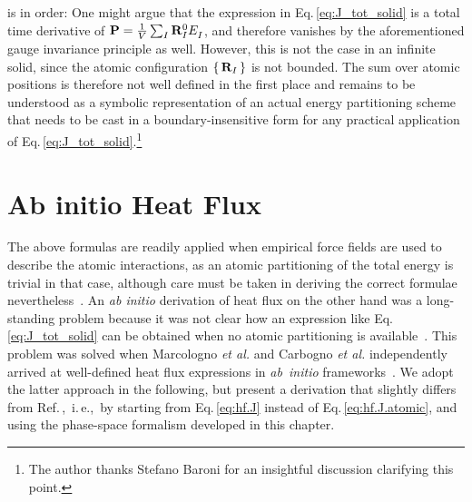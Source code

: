  is in order: One might argue that the expression in Eq.\,\eqref{eq:J_tot_solid} is a total time derivative of ${\bf P} = \frac{1}{V}  \sum_I {\bf R}_I^0 \fD E_I$, and therefore vanishes by the aforementioned gauge invariance principle as well. However, this is not the case in an infinite solid, since the atomic configuration $\set{{\bf R}_I}$ is not bounded. The sum over atomic positions is therefore not well defined in the first place and remains to be understood as a symbolic representation of an actual energy partitioning scheme that needs to be cast in a boundary-insensitive form for any practical application of Eq.\,\eqref{eq:J_tot_solid}.\footnote{The author thanks Stefano Baroni for an insightful discussion clarifying this point.}

\section{Ab initio Heat Flux}
The above formulas are readily applied when empirical force fields are used to describe the atomic interactions, as an atomic partitioning of the total energy is trivial in that case, although care must be taken in deriving the correct formulae nevertheless~\cite{Fan2015,Boone2019}. An \emph{ab initio} derivation of heat flux on the other hand was a long-standing problem because it was not clear how an expression like Eq.\,\eqref{eq:J_tot_solid} can be obtained when no atomic partitioning is available~\cite{Stackhouse2010}. This problem was solved when Marcologno \emph{et al.} and Carbogno \emph{et al.} independently arrived at well-defined heat flux expressions in \mbox{\emph{ab initio}} frameworks~\cite{Marcolongo2016,Carbogno2016}. We adopt the latter approach in the following, but present a derivation that slightly differs from Ref.\,\cite{Carbogno2016},~i.\,e.,~by starting from Eq.\,\eqref{eq:hf.J} instead of Eq.\,\eqref{eq:hf.J.atomic}, and using the phase-space formalism developed in this chapter.

